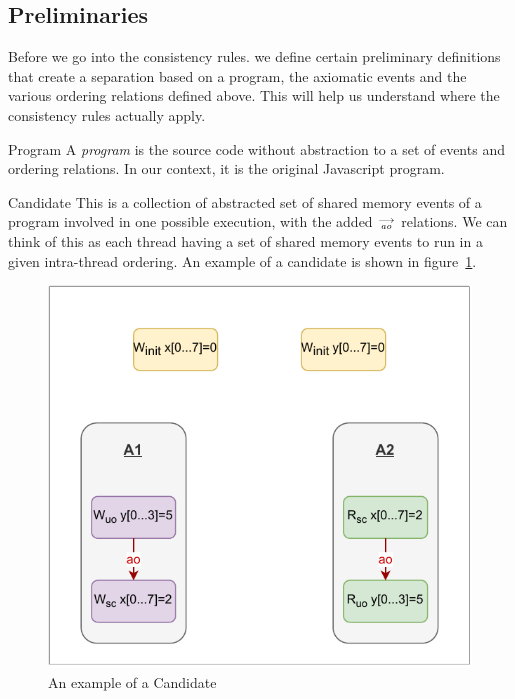 \subsection{Preliminaries}
    
    Before we go into the consistency rules. we define certain preliminary definitions that create a separation based on a program, the axiomatic events and the various ordering relations defined above. This will help us understand where the consistency rules actually apply.    
    
    \begin{definition}{Program} 
        A \emph{program} is the source code without abstraction to a set of events and ordering relations. In our context, it is the original Javascript program. 
        
    \end{definition}
    
    \begin{definition}{Candidate}
        This is a collection of abstracted set of shared memory events of a program involved in one possible execution, with the added $\stackrel{\longrightarrow}{_\textit{ao}}$ relations. We can think of this as each thread having a set of shared memory events to run in a given intra-thread ordering. An example of a candidate is shown in figure~\ref{fig:candidate}.
        
    
        \begin{figure}[H]
            \centering
            \includegraphics[scale=0.7]{ECMAScriptMemoryModel/candidate.pdf}
            \caption{An example of a Candidate}
            \label{fig:candidate}
        \end{figure}
        
    \end{definition}
    

